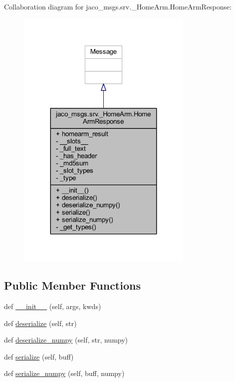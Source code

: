 Collaboration diagram for jaco\+\_\+msgs.\+srv.\+\_\+\+Home\+Arm.\+Home\+Arm\+Response\+:
\nopagebreak
\begin{figure}[H]
\begin{center}
\leavevmode
\includegraphics[width=239pt]{da/dff/classjaco__msgs_1_1srv_1_1__HomeArm_1_1HomeArmResponse__coll__graph}
\end{center}
\end{figure}
\subsection*{Public Member Functions}
\begin{DoxyCompactItemize}
\item 
def \hyperlink{classjaco__msgs_1_1srv_1_1__HomeArm_1_1HomeArmResponse_a6ab8f75e14296cfdb4b3ba162908a46a}{\+\_\+\+\_\+init\+\_\+\+\_\+} (self, args, kwds)
\item 
def \hyperlink{classjaco__msgs_1_1srv_1_1__HomeArm_1_1HomeArmResponse_a2850ae86066dc2ec10c7d16e1e00205f}{deserialize} (self, str)
\item 
def \hyperlink{classjaco__msgs_1_1srv_1_1__HomeArm_1_1HomeArmResponse_abbefbe88e5a6fdb53c7a468e7ba4b6a1}{deserialize\+\_\+numpy} (self, str, numpy)
\item 
def \hyperlink{classjaco__msgs_1_1srv_1_1__HomeArm_1_1HomeArmResponse_a7e1144232a4e2b20a8b2f52b8ca6bf67}{serialize} (self, buff)
\item 
def \hyperlink{classjaco__msgs_1_1srv_1_1__HomeArm_1_1HomeArmResponse_a07401a88ad6d7be89db6d53ec81c1006}{serialize\+\_\+numpy} (self, buff, numpy)
\end{DoxyCompactItemize}

